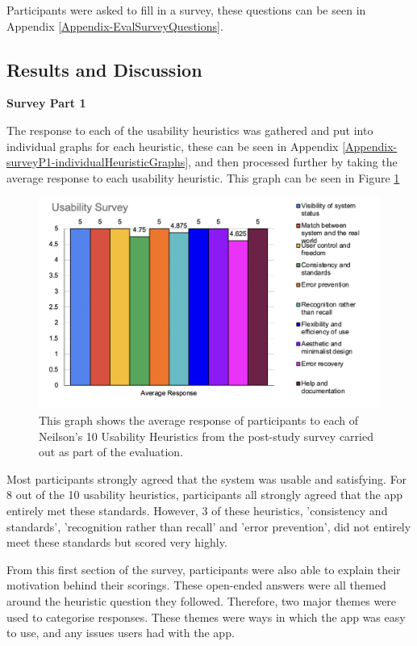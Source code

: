 \documentclass{l4proj}
\begin{document}
Participants were asked to fill in a survey, these questions can be seen in Appendix \ref{Appendix-EvalSurveyQuestions}.


\subsection{Results and Discussion}

\textbf{Survey Part 1}
 
The response to each of the usability heuristics was gathered and put into individual graphs for each heuristic, these can be seen in Appendix \ref{Appendix-surveyP1-individualHeuristicGraphs}, and then processed further by taking the average response to each usability heuristic. This graph can be seen in Figure \ref{fig: UserStudyGraph}

\begin{figure}[H]
    \begin{centering}
    \includegraphics[scale=0.75]{images/UserStudyGraph.png}
    \caption{This graph shows the average response of participants to each of Neilson's 10 Usability Heuristics from the post-study survey carried out as part of the evaluation.}
    \label{fig: UserStudyGraph}
    \end{centering}
\end{figure}
 
Most participants strongly agreed that the system was usable and satisfying. For 8 out of the 10 usability heuristics, participants all strongly agreed that the app entirely met these standards. However, 3 of these heuristics, 'consistency and standards', 'recognition rather than recall' and 'error prevention', did not entirely meet these standards but scored very highly.
 
From this first section of the survey, participants were also able to explain their motivation behind their scorings. These open-ended answers were all themed around the heuristic question they followed. Therefore, two major themes were used to categorise responses. These themes were ways in which the app was easy to use, and any issues users had with the app.
\end{document}
